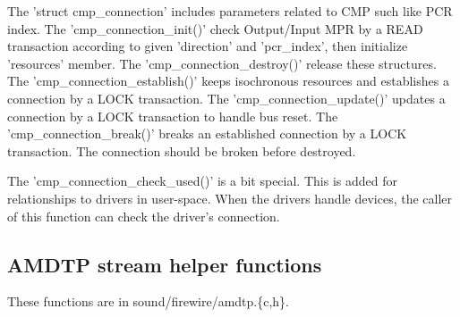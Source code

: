 \documentclass[onecolumn]{article}
\begin{document}
The 'struct cmp\_connection' includes parameters related to CMP such like PCR index. The 'cmp\_connection\_init()' check Output/Input MPR by a READ transaction according to given 'direction' and 'pcr\_index', then initialize 'resources' member. The 'cmp\_connection\_destroy()' release these structures. The 'cmp\_connection\_establish()' keeps isochronous resources and establishes a connection by a LOCK transaction. The 'cmp\_connection\_update()' updates a connection by a LOCK transaction to handle bus reset. The 'cmp\_connection\_break()' breaks an established connection by a LOCK transaction. The connection should be broken before destroyed.

The 'cmp\_connection\_check\_used()' is a bit special. This is added for relationships to drivers in user-space. When the drivers handle devices, the caller of this function can check the driver's connection.

\subsection{AMDTP stream helper functions}

These functions are in sound/firewire/amdtp.\{c,h\}.
\end{document}
